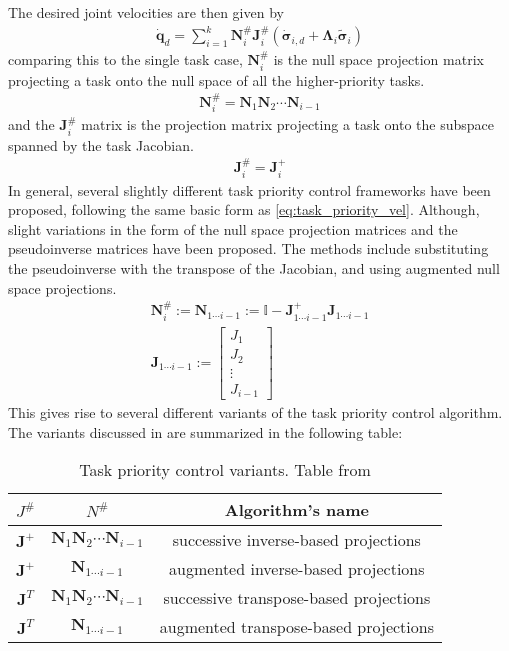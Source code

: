 The desired joint velocities are then given by
\begin{align}
    \dot{\bm{q}}_d = \sum_{i=1}^k \bm{N}_i^{\#}\bm{J}_i^{\#} \left(\dot{\bm{\sigma}}_{i,d} + \bm{\Lambda}_i \tilde{\bm{\sigma}}_i\right) \label{eq:task_priority_vel}
\end{align}
comparing this to the single task case, $\bm{N}_i^{\#}$ is the null space projection matrix
projecting a task onto the null space of all the higher-priority tasks.
\begin{align}
    \bm{N}_i^{\#} = \bm{N}_1 \bm{N}_2 \cdots \bm{N}_{i-1}
\end{align}
and the $\bm{J}_i^{\#}$ matrix is the projection matrix projecting a task onto the
subspace spanned by the task Jacobian.
\begin{align}
    \bm{J}_i^{\#} = \bm{J}_i^+
\end{align}
In general, several slightly different task priority control frameworks have
been proposed, following the same basic form as \autoref{eq:task_priority_vel}.
Although, slight variations in the form of the null space projection matrices
and the pseudoinverse matrices have been proposed. The methods include substituting
the pseudoinverse with the transpose of the Jacobian, and using augmented null space
projections.
\begin{subequations}
\begin{align}
    \bm{N}_i^{\#} := \bm{N}_{1\cdots i-1} := \mathbb{I} - \bm{J}_{1\cdots i-1}^+ \bm{J}_{1\cdots i-1} \\
    \bm{J}_{1\cdots i-1} := \begin{bmatrix}
        J_1 \\
        J_2 \\
        \vdots \\
        J_{i-1}
    \end{bmatrix}
\end{align}
\end{subequations}
This gives rise to several different variants of the task priority control algorithm.
The variants discussed in \cite{antonelli2009} are summarized in the following table:
\begin{table}[h]
    \centering
    \begin{tabular}{|c|c|c|}
        \hline
        $J^{\#}$ & $N^{\#}$ & Algorithm's name \\
        \hline
        $\bm{J}^+$ & $\bm{N}_1 \bm{N}_2 \cdots \bm{N}_{i-1}$ & successive inverse-based projections \\
        $\bm{J}^+$ & $\bm{N}_{1\cdots i-1}$ & augmented inverse-based projections \\
        $\bm{J}^T$ & $\bm{N}_1 \bm{N}_2 \cdots \bm{N}_{i-1}$ & successive transpose-based projections \\
        $\bm{J}^T$ & $\bm{N}_{1\cdots i-1}$ & augmented transpose-based projections \\
        \hline
    \end{tabular}
    \label{tab:tpc_variants}
    \caption{Task priority control variants. Table from \cite{antonelli2009}}
\end{table}

